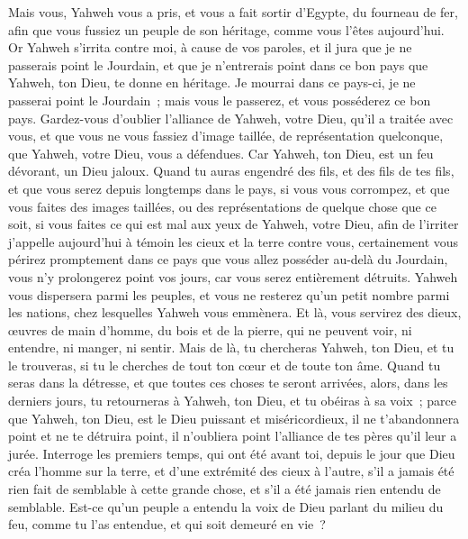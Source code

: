 \begin{multicols}{2}
Mais vous, Yahweh vous a pris, et vous a fait sortir d'Egypte, du fourneau de fer, afin que vous fussiez un peuple de son héritage, comme vous l'êtes aujourd'hui.
Or Yahweh s'irrita contre moi, à cause de vos paroles, et il jura que je ne passerais point le Jourdain, et que je n'entrerais point dans ce bon pays que Yahweh, ton Dieu, te donne en héritage.
Je mourrai dans ce pays-ci, je ne passerai point le Jourdain~; mais vous le passerez, et vous posséderez ce bon pays.
Gardez-vous d'oublier l'alliance de Yahweh, votre Dieu, qu'il a traitée avec vous, et que vous ne vous fassiez d'image taillée, de représentation quelconque, que Yahweh, votre Dieu, vous a défendues.
Car Yahweh, ton Dieu, est un feu dévorant, un Dieu jaloux.
Quand tu auras engendré des fils, et des fils de tes fils, et que vous serez depuis longtemps dans le pays, si vous vous corrompez, et que vous faites des images taillées, ou des représentations de quelque chose que ce soit, si vous faites ce qui est mal aux yeux de Yahweh, votre Dieu, afin de l'irriter
j'appelle aujourd'hui à témoin les cieux et la terre contre vous, certainement vous périrez promptement dans ce pays que vous allez posséder au-delà du Jourdain, vous n'y prolongerez point vos jours, car vous serez entièrement détruits.
Yahweh vous dispersera parmi les peuples, et vous ne resterez qu'un petit nombre parmi les nations, chez lesquelles Yahweh vous emmènera.
Et là, vous servirez des dieux, œuvres de main d'homme, du bois et de la pierre, qui ne peuvent voir, ni entendre, ni manger, ni sentir.
Mais de là, tu chercheras Yahweh, ton Dieu, et tu le trouveras, si tu le cherches de tout ton cœur et de toute ton âme.
Quand tu seras dans la détresse, et que toutes ces choses te seront arrivées, alors, dans les derniers jours, tu retourneras à Yahweh, ton Dieu, et tu obéiras à sa voix~;
parce que Yahweh, ton Dieu, est le Dieu puissant et miséricordieux, il ne t'abandonnera point et ne te détruira point, il n'oubliera point l'alliance de tes pères qu'il leur a jurée.
Interroge les premiers temps, qui ont été avant toi, depuis le jour que Dieu créa l'homme sur la terre, et d'une extrémité des cieux à l'autre, s'il a jamais été rien fait de semblable à cette grande chose, et s'il a été jamais rien entendu de semblable.
Est-ce qu'un peuple a entendu la voix de Dieu parlant du milieu du feu, comme tu l'as entendue, et qui soit demeuré en vie~?

\end{multicols}

